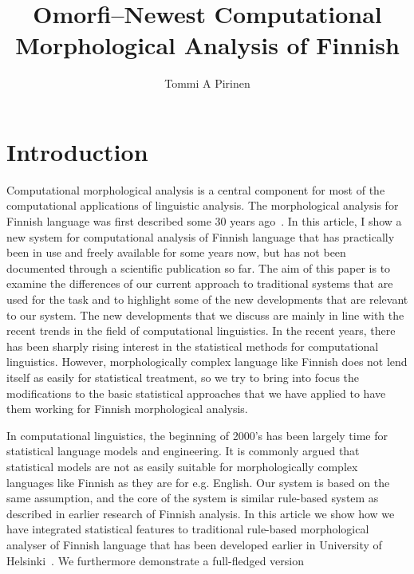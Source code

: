 \documentclass[a4paper,12pt]{article}
\title{Omorfi–Newest Computational Morphological Analysis of Finnish}
\author{Tommi A Pirinen}
\begin{document}
\maketitle

\section{Introduction}

Computational morphological analysis is a central component for most of the
computational applications of linguistic analysis. The morphological analysis
for Finnish language was first described some 30 years ago~\cite{}. In this
article, I show a new system for computational analysis of Finnish language that
has practically been in use and freely available for some years now, but has not
been documented through a scientific publication so far. The aim of this paper
is to examine the differences of our current approach to traditional systems
that are used for the task and to highlight some of the new developments that
are relevant to our system. The new developments that we discuss are mainly
in line with the recent trends in the field of computational linguistics. In the
recent years, there has been sharply rising interest in the statistical methods
for computational linguistics. However, morphologically complex language like
Finnish does not lend itself as easily for statistical treatment, so we try
to bring into focus the modifications to the basic statistical approaches that
we have applied to have them working for Finnish morphological analysis.

In computational linguistics, the beginning of 2000's has been
largely time for statistical language models and engineering. It is commonly
argued that statistical models are not as easily suitable for morphologically
complex languages like Finnish as they are for e.g. English. Our system is
based on the same assumption, and the core of the system is similar rule-based
system as described in earlier research of Finnish analysis. In this article
we show how we have integrated statistical features to traditional rule-based
morphological analyser of Finnish language that has been developed
earlier in University of Helsinki~\cite{pirinen2008}. We furthermore demonstrate
a full-fledged version
\end{document}
